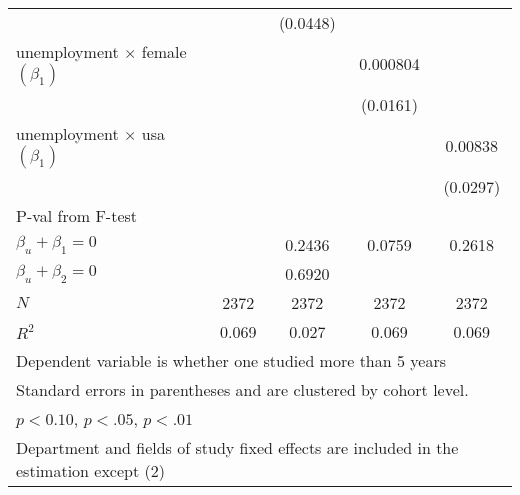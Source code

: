 \begin{table}[ht]
{\begin{tabular}{l*{4}{c}}
            &                     &    (0.0448)         &                     &                     \\
[1em]
unemployment $\times$ female  $\left( \beta_1 \right)$&                     &                     &    0.000804         &                     \\
            &                     &                     &    (0.0161)         &                     \\
[1em]
unemployment $\times$ usa  $\left( \beta_1 \right)$ &                     &                     &                     &     0.00838         \\
            &                     &                     &                     &    (0.0297)         \\
\hline
P-val from F-test &\\
$\beta_u + \beta_1 = 0 $ &                 &        0.2436         &        0.0759         &        0.2618         \\
$\beta_u + \beta_2 = 0$ &                 &        0.6920         &                 &                 \\
\hline
\(N\)       &        2372         &        2372         &        2372         &        2372         \\
\(R^{2}\)   &       0.069         &       0.027         &       0.069         &       0.069         \\
\hline\hline
\multicolumn{5}{l}{\footnotesize Dependent variable is whether one studied more than 5 years}\\
\multicolumn{5}{l}{\footnotesize Standard errors in parentheses and are clustered by cohort level.}\\
\multicolumn{5}{l}{\footnotesize  \sym{*} \(p<0.10\), \sym{**} \(p<.05\), \sym{***} \(p<.01\)}\\
\multicolumn{5}{l}{\footnotesize Department and fields of study fixed effects are included in the estimation  except (2)}\\
\end{tabular}%
}
\end{table}